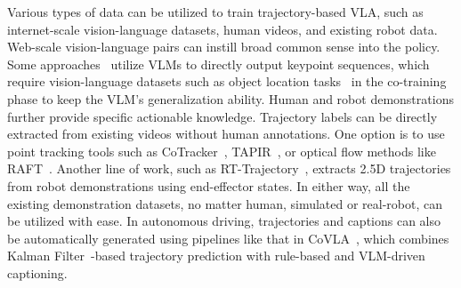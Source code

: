 \documentclass[10pt, a4paper, logo, copyright]{googledeepmind} %
\begin{document}
Various types of data can be utilized to train trajectory-based VLA, such as internet-scale vision-language datasets, human videos, and existing robot data. Web-scale vision-language pairs can instill broad common sense into the policy. Some approaches~\cite{li2025hamster} utilize VLMs to directly output keypoint sequences, which require vision-language datasets such as object location tasks~\cite{yuanrobopoint} in the co-training phase to keep the VLM's generalization ability. Human and robot demonstrations further provide specific actionable knowledge. Trajectory labels can be directly extracted from existing videos without human annotations. One option is to use point tracking tools such as CoTracker~\cite{karaev2024cotracker}, TAPIR~\cite{doersch2023tapir}, or optical flow methods like RAFT~\cite{teed2020raftrecurrentallpairsfield}. Another line of work, such as RT-Trajectory~\cite{rt-trajectory}, extracts 2.5D trajectories from robot demonstrations using end-effector states. In either way, all the existing demonstration datasets, no matter human, simulated or real-robot, can be utilized with ease. In autonomous driving, trajectories and captions can also be automatically generated using pipelines like that in CoVLA~\cite{covla_wacv2025}, which combines Kalman Filter~\cite{kalman1960new}-based trajectory prediction with rule-based and VLM-driven captioning.

\end{document}
